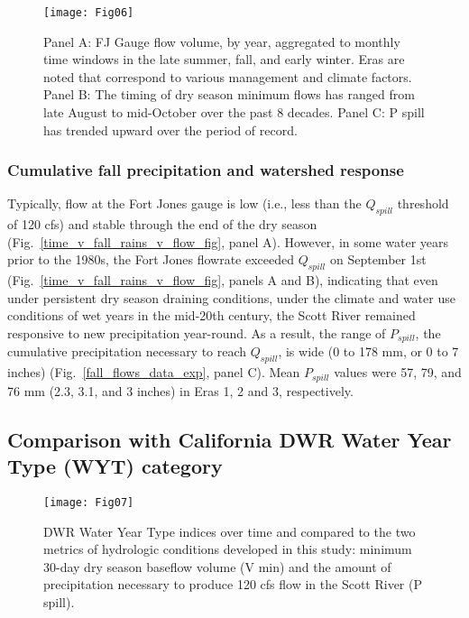 \documentclass[hess, manuscript]{copernicus}
\begin{document}
\begin{figure}
\texttt{[image: Fig06]} \caption{\label{fig:fall_flows_data_exp} Panel A: FJ Gauge flow volume, by year, aggregated to monthly time windows in the late summer, fall, and early winter. Eras are noted that correspond to various management and climate factors. Panel B: The timing of dry season minimum flows has ranged from late August to mid-October over the past 8 decades. Panel C: P spill has trended upward over the period of record.}\label{fig:fall_flows_data_exp}
\end{figure}

\subsubsection{Cumulative fall precipitation and watershed response}

Typically, flow at the Fort Jones gauge is low (i.e., less than the
$Q_{spill}$ threshold of 120 cfs) and stable through the end of the
dry season (Fig.~\ref{time_v_fall_rains_v_flow_fig}, panel A).
However, in some water years prior to the 1980s, the Fort Jones flowrate
exceeded $Q_{spill}$ on September 1st
(Fig.~\ref{time_v_fall_rains_v_flow_fig}, panels A and B), indicating
that even under persistent dry season draining conditions, under the
climate and water use conditions of wet years in the mid-20th century,
the Scott River remained responsive to new precipitation year-round. As
a result, the range of $P_{spill}$, the cumulative precipitation
necessary to reach $Q_{spill}$, is wide (0 to 178 mm, or 0 to 7
inches) (Fig.~\ref{fall_flows_data_exp}, panel C). Mean $P_{spill}$
values were 57, 79, and 76 mm (2.3, 3.1, and 3 inches) in Eras 1, 2 and
3, respectively.

\subsection{Comparison with California DWR Water Year Type (WYT)
category}

\begin{figure}
\texttt{[image: Fig07]} \caption{\label{fig:resp_vars_wyt} DWR Water Year Type indices over time and compared to the two metrics of hydrologic conditions developed in this study: minimum 30-day dry season baseflow volume (V min) and the amount of precipitation necessary to produce 120 cfs flow in the Scott River (P spill).}\label{fig:resp_vars_wyt}
\end{figure}
\end{document}
